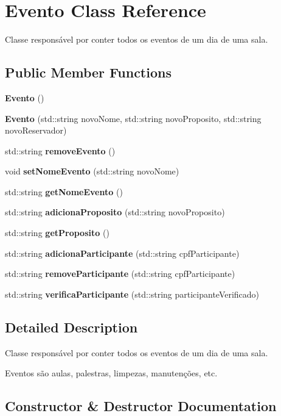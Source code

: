 \section{Evento Class Reference}
\label{class_evento}


Classe responsável por conter todos os eventos de um dia de uma sala.  


\subsection*{Public Member Functions}
\begin{DoxyCompactItemize}
\item 
\textbf{ Evento} ()
\item 
\textbf{ Evento} (std\+::string novo\+Nome, std\+::string novo\+Proposito, std\+::string novo\+Reservador)
\item 
std\+::string \textbf{ remove\+Evento} ()
\item 
void \textbf{ set\+Nome\+Evento} (std\+::string novo\+Nome)
\item 
std\+::string \textbf{ get\+Nome\+Evento} ()
\item 
std\+::string \textbf{ adiciona\+Proposito} (std\+::string novo\+Proposito)
\item 
std\+::string \textbf{ get\+Proposito} ()
\item 
std\+::string \textbf{ adiciona\+Participante} (std\+::string cpf\+Participante)
\item 
std\+::string \textbf{ remove\+Participante} (std\+::string cpf\+Participante)
\item 
std\+::string \textbf{ verifica\+Participante} (std\+::string participante\+Verificado)
\end{DoxyCompactItemize}


\subsection{Detailed Description}
Classe responsável por conter todos os eventos de um dia de uma sala. 

Eventos são aulas, palestras, limpezas, manutenções, etc. 

\subsection{Constructor \& Destructor Documentation}
\mbox{\label{class_evento_a7aba3bd7a832c5365ea0ccb318511452}} 
